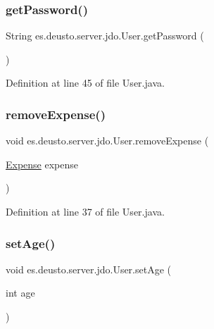 \subsubsection{\texorpdfstring{get\+Password()}{getPassword()}}
{\footnotesize\ttfamily String es.\+deusto.\+server.\+jdo.\+User.\+get\+Password (\begin{DoxyParamCaption}{ }\end{DoxyParamCaption})}



Definition at line 45 of file User.\+java.

\mbox{\label{classes_1_1deusto_1_1server_1_1jdo_1_1_user_a2ecb8023580fdee24c3f6d6a28b23a86}} 
\subsubsection{\texorpdfstring{remove\+Expense()}{removeExpense()}}
{\footnotesize\ttfamily void es.\+deusto.\+server.\+jdo.\+User.\+remove\+Expense (\begin{DoxyParamCaption}\item[{\hyperlink{classes_1_1deusto_1_1server_1_1jdo_1_1_expense}{Expense}}]{expense }\end{DoxyParamCaption})}



Definition at line 37 of file User.\+java.

\mbox{\label{classes_1_1deusto_1_1server_1_1jdo_1_1_user_adc28a24f0a24c86ca31b10d8ffb23232}} 
\subsubsection{\texorpdfstring{set\+Age()}{setAge()}}
{\footnotesize\ttfamily void es.\+deusto.\+server.\+jdo.\+User.\+set\+Age (\begin{DoxyParamCaption}\item[{int}]{age }\end{DoxyParamCaption})}



